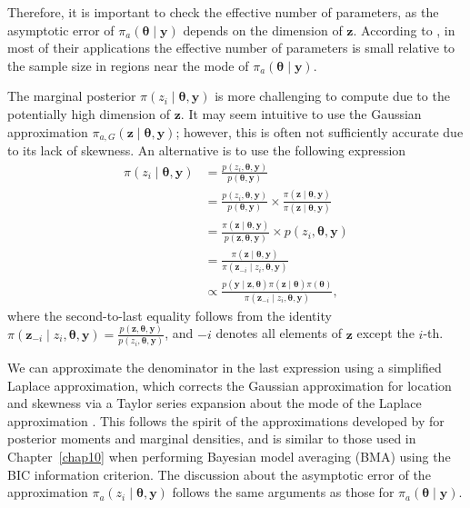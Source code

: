Therefore, it is important to check the effective number of parameters, as the asymptotic error of $\pi_a(\boldsymbol{\theta} \mid \boldsymbol{y})$ depends on the dimension of $\boldsymbol{z}$. According to \cite{rue2009approximate}, in most of their applications the effective number of parameters is small relative to the sample size in regions near the mode of $\pi_a(\boldsymbol{\theta} \mid \boldsymbol{y})$. 

The marginal posterior $\pi(z_i \mid \boldsymbol{\theta}, \boldsymbol{y})$ is more challenging to compute due to the potentially high dimension of $\boldsymbol{z}$. It may seem intuitive to use the Gaussian approximation $\pi_{a,G}(\boldsymbol{z} \mid \boldsymbol{\theta}, \boldsymbol{y})$; however, this is often not sufficiently accurate due to its lack of skewness. An alternative is to use the following expression
\begin{align*}
	\pi(z_i\mid \boldsymbol{\theta},\boldsymbol{y})&=\frac{p(z_i,\boldsymbol{\theta},\boldsymbol{y})}{p(\boldsymbol{\theta},\boldsymbol{y})}\\
	&=\frac{p(z_i,\boldsymbol{\theta},\boldsymbol{y})}{p(\boldsymbol{\theta},\boldsymbol{y})}\times \frac{\pi(\boldsymbol{z}\mid\boldsymbol{\theta},\boldsymbol{y})}{\pi(\boldsymbol{z}\mid\boldsymbol{\theta},\boldsymbol{y})}\\
	&=\frac{\pi(\boldsymbol{z}\mid\boldsymbol{\theta},\boldsymbol{y})}{p(\boldsymbol{z},\boldsymbol{\theta},\boldsymbol{y})}\times p(z_i,\boldsymbol{\theta},\boldsymbol{y})\\
	&=\frac{\pi(\boldsymbol{z}\mid\boldsymbol{\theta},\boldsymbol{y})}{\pi(\boldsymbol{z}_{-i}\mid z_i,\boldsymbol{\theta},\boldsymbol{y})}\\
	&\propto \frac{p(\boldsymbol{y}\mid \boldsymbol{z},\boldsymbol{\theta})\pi(\boldsymbol{z}\mid\boldsymbol{\theta})\pi(\boldsymbol{\theta})}{\pi(\boldsymbol{z}_{-i}\mid z_i,\boldsymbol{\theta},\boldsymbol{y})}, 
\end{align*}
where the second-to-last equality follows from the identity $\pi(\boldsymbol{z}_{-i} \mid z_i, \boldsymbol{\theta}, \boldsymbol{y}) = \frac{p(\boldsymbol{z}, \boldsymbol{\theta}, \boldsymbol{y})}{p(z_i, \boldsymbol{\theta}, \boldsymbol{y})}$, and $-i$ denotes all elements of $\boldsymbol{z}$ except the $i$-th. 

We can approximate the denominator in the last expression using a simplified Laplace approximation, which corrects the Gaussian approximation for location and skewness via a Taylor series expansion about the mode of the Laplace approximation \cite{rue2009approximate}. This follows the spirit of the approximations developed by \cite{Tierney1986, tierney1989fully} for posterior moments and marginal densities, and is similar to those used in Chapter~\ref{chap10} when performing Bayesian model averaging (BMA) using the BIC information criterion. The discussion about the asymptotic error of the approximation $\pi_{a}(z_i \mid \boldsymbol{\theta}, \boldsymbol{y})$ follows the same arguments as those for $\pi_a(\boldsymbol{\theta} \mid \boldsymbol{y})$.

